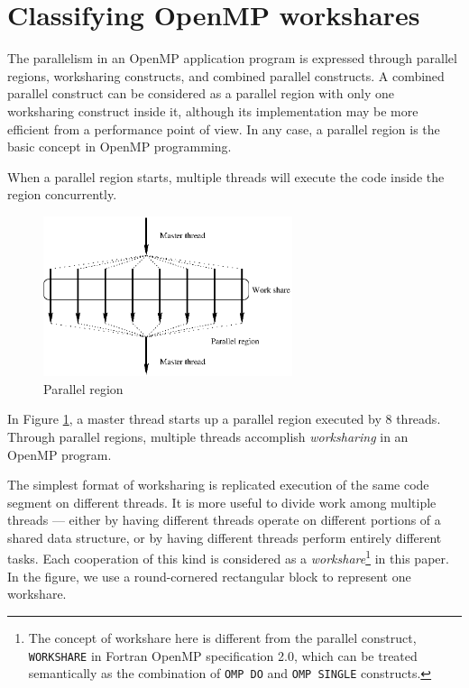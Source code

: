 
\section{Classifying OpenMP workshares}

The parallelism in an OpenMP application program is expressed through
parallel regions, worksharing constructs, and combined parallel
constructs. A combined parallel construct can be considered as a
parallel region with only one worksharing construct inside it,
although its implementation may be more efficient from a performance
point of view. In any case, a parallel region is the basic concept
in OpenMP programming.

When a parallel region starts, multiple threads will execute the code
inside the region concurrently\cite{Cha01}.

\begin{figure}[!h]
  \begin{center}
    \includegraphics[angle=0, width=0.65\textwidth]{parregion.eps}
    \caption{\footnotesize Parallel region}
    \label{fig:parregion}
  \end{center}
\end{figure}

In Figure \ref{fig:parregion}, a master thread starts up a parallel
region executed by 8 threads. Through parallel regions, multiple
threads accomplish \emph{worksharing} in an OpenMP program.

The simplest format of worksharing is replicated execution of the same
code segment on different threads. It is more useful to divide work
among multiple threads --- either by having different threads operate
on different portions of a shared data structure, or by having
different threads perform entirely different tasks. Each cooperation of this
kind is considered as a \emph{workshare}\footnote{The
  concept of workshare here is different from the parallel construct,
  \texttt{WORKSHARE} in Fortran OpenMP specification 2.0, which can be
  treated semantically as the combination of \texttt{OMP DO} and
  \texttt{OMP SINGLE} constructs.} in this paper. In the figure, we
use a round-cornered rectangular block to represent one workshare.

